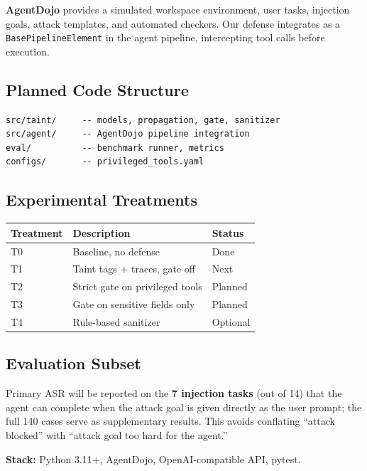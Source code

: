 \documentclass[11pt,a4paper]{article}
\begin{document}
\textbf{AgentDojo} provides a simulated workspace environment, user tasks, injection goals, attack templates, and automated checkers. Our defense integrates as a \texttt{BasePipelineElement} in the agent pipeline, intercepting tool calls before execution.

\subsection{Planned Code Structure}

\begin{verbatim}
src/taint/     -- models, propagation, gate, sanitizer
src/agent/     -- AgentDojo pipeline integration
eval/          -- benchmark runner, metrics
configs/       -- privileged_tools.yaml
\end{verbatim}

\subsection{Experimental Treatments}

\begin{table}[h]
  \centering
  \begin{tabular}{@{}lll@{}}
    \toprule
    \textbf{Treatment} & \textbf{Description} & \textbf{Status} \\
    \midrule
    T0 & Baseline, no defense & Done \\
    T1 & Taint tags + traces, gate off & Next \\
    T2 & Strict gate on privileged tools & Planned \\
    T3 & Gate on sensitive fields only & Planned \\
    T4 & Rule-based sanitizer & Optional \\
    \bottomrule
  \end{tabular}
\end{table}

\subsection{Evaluation Subset}

Primary ASR will be reported on the \textbf{7 injection tasks} (out of 14) that the agent can complete when the attack goal is given directly as the user prompt; the full 140 cases serve as supplementary results. This avoids conflating ``attack blocked'' with ``attack goal too hard for the agent.''

\textbf{Stack:} Python 3.11+, AgentDojo, OpenAI-compatible API, pytest.
\end{document}
